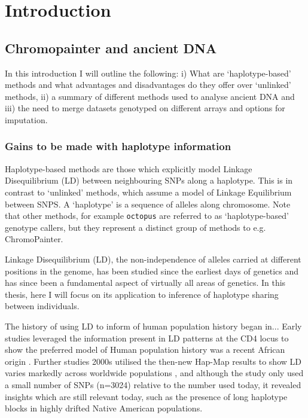 \chapter{Introduction}

\section{Chromopainter and ancient DNA}

In this introduction I will outline the following: i) What are `haplotype-based' methods and what advantages and disadvantages do they offer over `unlinked' methods, ii) a summary of different methods used to analyse ancient DNA and iii) the need to merge datasets genotyped on different arrays and options for imputation. 

\subsection{Gains to be made with haplotype information}

Haplotype-based methods are those which explicitly model Linkage Disequilibrium (LD) between neighbouring SNPs along a haplotype. This is in contrast to `unlinked' methods, which assume a model of Linkage Equilibrium between SNPS. A `haplotype' is a sequence of alleles along chromosome. Note that other methods, for example \texttt{octopus} \cite{octopus} are referred to as `haplotype-based' genotype callers, but they represent a distinct group of methods to e.g. ChromoPainter.  

Linkage Disequilibrium (LD), the non-independence of alleles carried at different positions in the genome, has been studied since the earliest days of genetics \cite{morgan1912complete, bateson1902experiments} and has since been a fundamental aspect of virtually all areas of genetics. In this thesis, here I will focus on its application to inference of haplotype sharing between individuals. 

The history of using LD to inform of human population history began in... Early studies leveraged the information present in LD patterns at the CD4 locus to show the preferred model of Human population history was a recent African origin \cite{tishkoff1996global}. Further studies 2000s \cite{conrad2006worldwide} utilised the then-new Hap-Map results to show LD varies markedly across worldwide populations \cite{conrad2006worldwide}, and although the study only used a small number of SNPs (n=3024) relative to the number used today, it revealed insights which are still relevant today, such as the presence of long haplotype blocks in highly drifted Native American populations.

